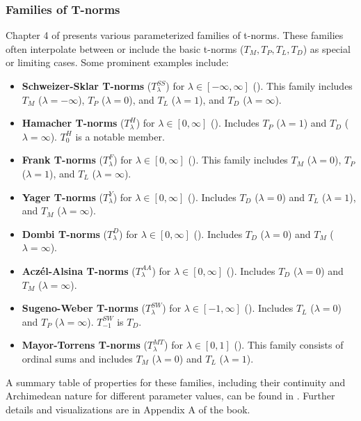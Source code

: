 \subsubsection{Families of T-norms}

Chapter 4 of \cite{Klement2000} presents various parameterized families of t-norms. These families often interpolate between or include the basic t-norms ($T_M, T_P, T_L, T_D$) as special or limiting cases. Some prominent examples include:

\begin{itemize}
    \item \textbf{Schweizer-Sklar T-norms} ($T_\lambda^{SS}$) for $\lambda \in [-\infty, \infty]$ (\cite[Example 4.3, p.~104]{Klement2000}). This family includes $T_M$ ($\lambda=-\infty$), $T_P$ ($\lambda=0$), and $T_L$ ($\lambda=1$), and $T_D$ ($\lambda=\infty$).
    \item \textbf{Hamacher T-norms} ($T_\lambda^H$) for $\lambda \in [0, \infty]$ (\cite[Example 4.5, p.~106]{Klement2000}). Includes $T_P$ ($\lambda=1$) and $T_D$ ($\lambda=\infty$). $T_0^H$ is a notable member.
    \item \textbf{Frank T-norms} ($T_\lambda^F$) for $\lambda \in [0, \infty]$ (\cite[Example 4.7, p.~108]{Klement2000}). This family includes $T_M$ ($\lambda=0$), $T_P$ ($\lambda=1$), and $T_L$ ($\lambda=\infty$).
    \item \textbf{Yager T-norms} ($T_\lambda^Y$) for $\lambda \in [0, \infty]$ (\cite[Example 4.9, p.~110]{Klement2000}). Includes $T_D$ ($\lambda=0$) and $T_L$ ($\lambda=1$), and $T_M$ ($\lambda=\infty$).
    \item \textbf{Dombi T-norms} ($T_\lambda^D$) for $\lambda \in [0, \infty]$ (\cite[Example 4.11, p.~112]{Klement2000}). Includes $T_D$ ($\lambda=0$) and $T_M$ ($\lambda=\infty$).
    \item \textbf{Aczél-Alsina T-norms} ($T_\lambda^{AA}$) for $\lambda \in [0, \infty]$ (\cite[Example 4.15, p.~116]{Klement2000}). Includes $T_D$ ($\lambda=0$) and $T_M$ ($\lambda=\infty$).
    \item \textbf{Sugeno-Weber T-norms} ($T_\lambda^{SW}$) for $\lambda \in [-1, \infty]$ (\cite[Example 4.13, p.~114]{Klement2000}). Includes $T_L$ ($\lambda=0$) and $T_P$ ($\lambda=\infty$). $T_{-1}^{SW}$ is $T_D$.
    \item \textbf{Mayor-Torrens T-norms} ($T_\lambda^{MT}$) for $\lambda \in [0, 1]$ (\cite[Example 4.17, p.~118]{Klement2000}). This family consists of ordinal sums and includes $T_M$ ($\lambda=0$) and $T_L$ ($\lambda=1$).
\end{itemize}
A summary table of properties for these families, including their continuity and Archimedean nature for different parameter values, can be found in \cite[Table 4.1, p.~119]{Klement2000}. Further details and visualizations are in Appendix A of the book.

